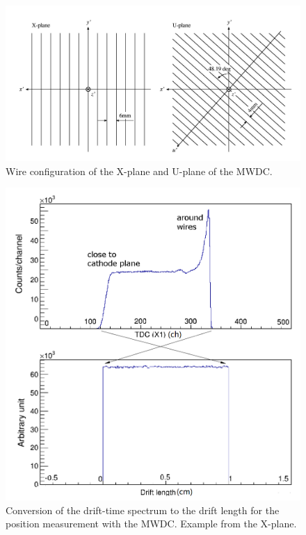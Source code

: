 \begin{figure}[tpb]
  \begin{center}
    \centerline{\includegraphics[scale=0.3]{graph/ch4/XUplane}}
    \caption{Wire configuration of the X-plane and U-plane of the MWDC.}
    \label{fig:XUplane}
  \end{center}
\end{figure}

\begin{figure}[tpb]
  \begin{center}
    \centerline{\includegraphics[scale=0.5]{graph/ch4/drift_time}}
    \caption{Conversion of the drift-time spectrum to the drift length for the position measurement with the MWDC. Example from the X-plane.}
    \label{fig:drift_time}
  \end{center}
\end{figure}

